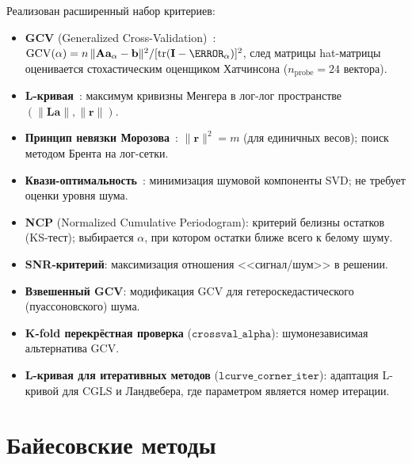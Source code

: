 \documentclass[12pt,a4paper]{article}
\newcommand{\va}{\mathbf{a}}
\newcommand{\vb}{\mathbf{b}}
\newcommand{\vr}{\mathbf{r}}
\newcommand{\mA}{\mathbf{A}}
\newcommand{\mL}{\mathbf{L}}
\newcommand{\mI}{\mathbf{I}}
\begin{document}
Реализован расширенный набор критериев:

\begin{itemize}[leftmargin=*,itemsep=2pt]
  \item \textbf{GCV} (Generalized Cross-Validation)~\citep{Golub1979}:
        $\mathrm{GCV}(\alpha) = n\,\|\mA\va_\alpha - \vb\|^2 / [\mathrm{tr}(\mI - \mH_\alpha)]^2$,
        след матрицы hat-матрицы оценивается стохастическим
        оценщиком Хатчинсона ($n_{\mathrm{probe}} = 24$ вектора).

  \item \textbf{L-кривая}~\citep{Hansen1992}:
        максимум кривизны Менгера в лог-лог пространстве
        $(\|\mL\va\|,\|\vr\|)$.

  \item \textbf{Принцип невязки Морозова}~\citep{Morozov1966}:
        $\|\vr\|^2 = m$ (для единичных весов);
        поиск методом Брента на лог-сетки.

  \item \textbf{Квази-оптимальность}~\citep{Hochstenbach2015}:
        минимизация шумовой компоненты SVD; не требует
        оценки уровня шума.

  \item \textbf{NCP} (Normalized Cumulative Periodogram):
        критерий белизны остатков (KS-тест);
        выбирается $\alpha$, при котором остатки ближе всего
        к белому шуму.

  \item \textbf{SNR-критерий}: максимизация отношения
        <<сигнал/шум>> в решении.

  \item \textbf{Взвешенный GCV}: модификация GCV для
        гетероскедастического (пуассоновского) шума.

  \item \textbf{K-fold перекрёстная проверка} ($\texttt{crossval\_alpha}$):
        шумонезависимая альтернатива GCV.

  \item \textbf{L-кривая для итеративных методов}
        ($\texttt{lcurve\_corner\_iter}$): адаптация L-кривой
        для CGLS и Ландвебера, где параметром является
        номер итерации.
\end{itemize}


\section{Байесовские методы}
\label{sec:bayesian}
\end{document}
